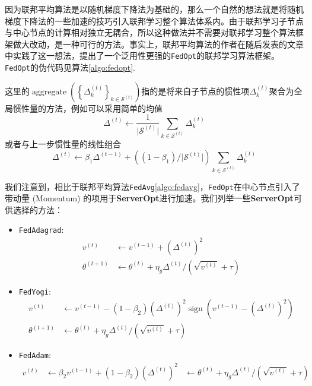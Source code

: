 因为联邦平均算法是以随机梯度下降法为基础的，那么一个自然的想法就是将随机梯度下降法的一些加速的技巧\cite{adagrad, adam, Zaheer_2018_yogi, adamw_amsgrad}引入联邦学习整个算法体系内。由于联邦学习子节点与中心节点的计算相对独立无耦合，所以这种做法并不需要对联邦学习整个算法框架做大改动，是一种可行的方法。事实上，联邦平均算法的作者在随后发表的文章\parencite{reddi2020fed_opt}中实践了这一想法，提出了一个泛用性更强的\texttt{FedOpt}的联邦学习算法框架。\texttt{FedOpt}的伪代码见算法\ref{algo:fedopt}. 



这里的$\operatorname{aggregate} \left( \left\{ \Delta_{k}^{(t)} \right\}_{k \in \mathcal{S}^{(t)}} \right)$指的是将来自子节点的惯性项$\Delta_{k}^{(t)}$聚合为全局惯性量的方法，例如可以采用简单的均值
\begin{equation*}
\Delta^{(t)} \gets \frac{1}{\lvert \mathcal{S}^{(t)} \rvert} \sum\limits_{k \in \mathcal{S}^{(t)}} \Delta_{k}^{(t)}
\end{equation*}
或者与上一步惯性量的线性组合
\begin{equation*}
\Delta^{(t)} \gets \beta_1 \Delta^{(t-1)} + \left( (1 - \beta_1) / \lvert \mathcal{S}^{(t)} \rvert \right) \sum_{k \in \mathcal{S}^{(t)}} \Delta_{k}^{(t)}
\end{equation*}

我们注意到，相比于联邦平均算法\texttt{FedAvg}\ref{algo:fedavg}，\texttt{FedOpt}在中心节点引入了带动量 (Momentum) 的项用于\textbf{ServerOpt}进行加速。我们列举一些\textbf{ServerOpt}可供选择的方法\cite{reddi2020fed_opt}：
\begin{itemize}
    \item \texttt{FedAdagrad}:
    \begin{equation*}
    \begin{aligned}
    v^{(t)} & \gets v^{(t-1)} + ( \Delta^{(t)} )^2 \\
    \theta^{(t+1)} & \gets \theta^{(t)} + \eta_g \Delta^{(t)} / (\sqrt{v^{(t)}}+\tau)
    \end{aligned}
    \end{equation*}
    \item \texttt{FedYogi}:
    \begin{equation*}
    \begin{aligned}
    v^{(t)} & \gets v^{(t-1)} - (1 - \beta_2) ( \Delta^{(t)} )^2 \operatorname{sign}(v^{(t-1)} - ( \Delta^{(t)} )^2) \\
    \theta^{(t+1)} & \gets \theta^{(t)} + \eta_g \Delta^{(t)} / (\sqrt{v^{(t)}}+\tau)
    \end{aligned}
    \end{equation*}
    \item \texttt{FedAdam}:
    \begin{equation*}
    \begin{aligned}
    v^{(t)} & \gets \beta_2 v^{(t-1)} + (1 - \beta_2) ( \Delta^{(t)} )^2 & \gets \theta^{(t)} + \eta_g \Delta^{(t)} / (\sqrt{v^{(t)}}+\tau)
    \end{aligned}
    \end{equation*}
\end{itemize}

